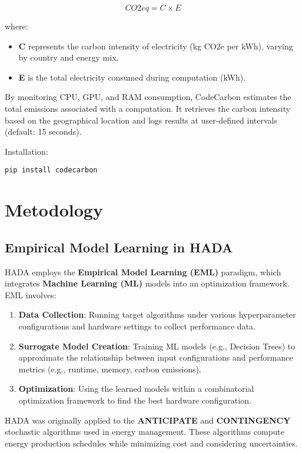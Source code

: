 \documentclass[a4paper,singleside,12pt]{report} %
\begin{document}
\begin{equation}
CO2eq = C \times E
\end{equation}

where:
\begin{itemize}
\item \textbf{C} represents the carbon intensity of electricity (kg CO2e per kWh), varying by country and energy mix.
\item \textbf{E} is the total electricity consumed during computation (kWh).
\end{itemize}

By monitoring CPU, GPU, and RAM consumption, CodeCarbon estimates the total emissions associated with a computation. 
It retrieves the carbon intensity based on the geographical location and logs results at user-defined intervals 
(default: 15 seconds).

Installation:
\begin{verbatim}
pip install codecarbon
\end{verbatim}

\chapter{Metodology}

\section{Empirical Model Learning in HADA}

HADA employs the \textbf{Empirical Model Learning (EML)} paradigm, which integrates \textbf{Machine Learning (ML)} models 
into an optimization framework. EML involves:

\begin{enumerate}
\item \textbf{Data Collection}: Running target algorithms under various hyperparameter configurations and hardware settings 
to collect performance data.
\item \textbf{Surrogate Model Creation}: Training ML models (e.g., Decision Trees) to approximate the relationship between 
input configurations and performance metrics (e.g., runtime, memory, carbon emissions).
\item \textbf{Optimization}: Using the learned models within a combinatorial optimization framework to find the best hardware
 configuration.
\end{enumerate}

HADA was originally applied to the \textbf{ANTICIPATE} and \textbf{CONTINGENCY} stochastic algorithms used in energy 
management. These algorithms compute energy production schedules while minimizing cost and considering uncertainties.
\end{document}
